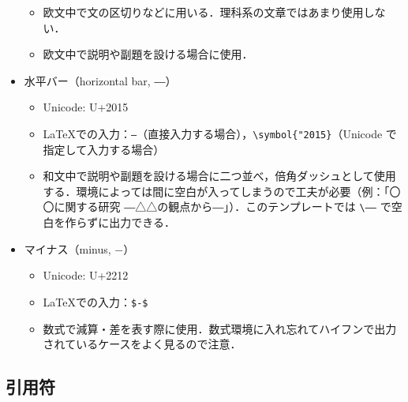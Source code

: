 \begin{itemize}
\begin{itemize}
        \item 欧文中で文の区切りなどに用いる．理科系の文章ではあまり使用しない．
        \item 欧文中で説明や副題を設ける場合に使用．
    \end{itemize}
    \item 水平バー（horizontal bar, ―）
    \begin{itemize}
        \item Unicode: U+2015
        \item \LaTeX での入力：\verb|―|（直接入力する場合），\verb|\symbol{"2015}|（Unicode で指定して入力する場合）
        \item 和文中で説明や副題を設ける場合に二つ並べ，倍角ダッシュとして使用する．環境によっては間に空白が入ってしまうので工夫が必要（例：「〇〇に関する研究 \――△△の観点から\――」）．このテンプレートでは \verb|\――| で空白を作らずに出力できる．
    \end{itemize}
    \item マイナス（minus, $-$）
    \begin{itemize}
        \item Unicode: U+2212
        \item \LaTeX での入力：\verb|$-$|
        \item 数式で減算・差を表す際に使用．数式環境に入れ忘れてハイフンで出力されているケースをよく見るので注意．
    \end{itemize}
\end{itemize}

\subsection*{引用符}
\label{ssec:quotation}


